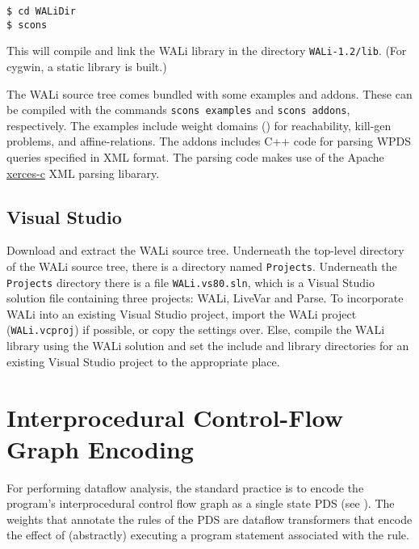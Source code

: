 \documentclass[english,a4paper,11pt]{article}
\theoremstyle{definition}
\begin{document}
\noindent
\begin{cmdbox}
\begin{verbatim}
$ cd WALiDir
$ scons 
\end{verbatim}
\end{cmdbox}

\noindent This will compile and link the WALi library in the directory
\verb!WALi-1.2/lib!. (For cygwin, a static library is built.) 

The WALi source tree comes bundled with some examples and addons. These can be
compiled with the commands \verb!scons examples! and \verb!scons addons!,
respectively. The examples include weight domains ()
for reachability, kill-gen problems, and affine-relations. The addons includes
C++ code for parsing WPDS queries specified in XML format. The parsing code
makes use of the Apache
\href{http://xerces.apache.org/xerces-c/}{xerces-c} XML parsing
libarary.


\subsection{Visual Studio}
\label{Se:VisualStudio}
Download and extract the WALi source tree. Underneath the top-level directory of the WALi
source tree, there is a directory named \verb!Projects!. Underneath the
\verb!Projects! directory there is a file \verb!WALi.vs80.sln!, which is a
Visual Studio solution file containing three projects: WALi, LiveVar and
Parse. To incorporate WALi into an existing Visual Studio project, import the
WALi project (\verb!WALi.vcproj!) if possible, or copy the settings over.
Else, compile the WALi library using the WALi solution and set the include and
library directories for an existing Visual Studio project to the appropriate
place.

\section{Interprocedural Control-Flow Graph Encoding}
\label{Se:icfg-encoding}
For performing dataflow analysis, the standard practice is to encode the
program's interprocedural control flow graph as a single state PDS (see
). The weights that annotate the rules of the PDS are
dataflow transformers that encode the effect of (abstractly) executing a
program statement associated with the rule.
\end{document}
